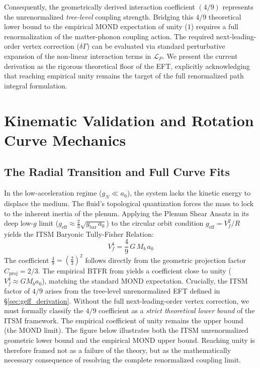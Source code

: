 \documentclass[aps,prd,10pt,twocolumn,superscriptaddress,nofootinbib]{revtex4-2}
\begin{document}
Consequently, the geometrically derived interaction coefficient $(4/9)$ represents the unrenormalized \emph{tree-level} coupling strength. Bridging this $4/9$ theoretical lower bound to the empirical MOND expectation of unity ($1$) requires a full renormalization of the matter-phonon coupling action. The required next-leading-order vertex correction ($\delta \Gamma$) can be evaluated via standard perturbative expansion of the non-linear interaction terms in $\mathcal{L}_P$. We present the current derivation as the rigorous theoretical floor of the EFT, explicitly acknowledging that reaching empirical unity remains the target of the full renormalized path integral formulation.
\section{Kinematic Validation and Rotation Curve Mechanics}

\subsection{The Radial Transition and Full Curve Fits}
In the low-acceleration regime ($g_N \ll a_0$), the system lacks the kinetic energy to displace the medium. The fluid's topological quantization forces the mass to lock to the inherent inertia of the plenum. Applying the Plenum Shear Ansatz in its deep low-$g$ limit ($g_{\text{eff}} \approx \frac{2}{3}\sqrt{g_{\text{bar}}\,a_0}$) to the circular orbit condition $g_{\text{eff}} = V_f^2/R$ yields the ITSM Baryonic Tully-Fisher Relation:
\begin{equation}
V_f^4 = \frac{4}{9}\,G\,M_b\,a_0
\end{equation}
The coefficient $\frac{4}{9} = \left(\frac{2}{3}\right)^2$ follows directly from the geometric projection factor $C_{\text{proj}} = 2/3$. The empirical BTFR from \citet{sparc} yields a coefficient close to unity ($V_f^4 \approx G M_b a_0$), matching the standard MOND expectation. Crucially, the ITSM factor of $4/9$ arises from the tree-level unrenormalized EFT defined in \S\ref{sec:geff_derivation}. Without the full next-leading-order vertex correction, we must formally classify the $4/9$ coefficient as a \emph{strict theoretical lower bound} of the ITSM framework. The empirical coefficient of unity remains the upper bound (the MOND limit). The figure below illustrates both the ITSM unrenormalized geometric lower bound and the empirical MOND upper bound. Reaching unity is therefore framed not as a failure of the theory, but as the mathematically necessary consequence of resolving the complete renormalized coupling limit.
\end{document}
